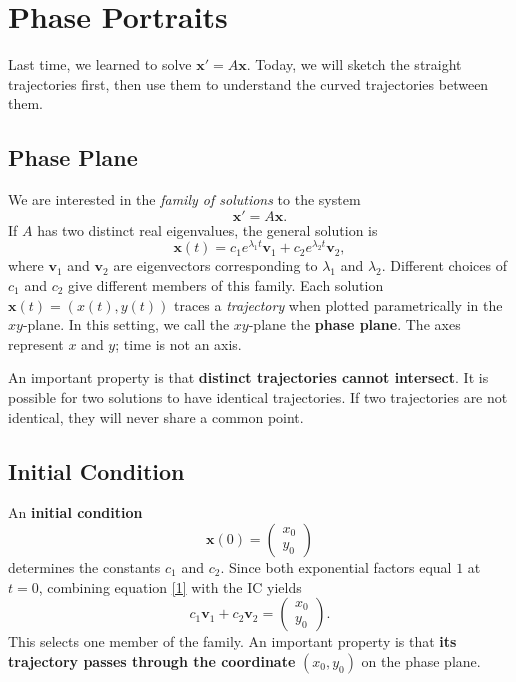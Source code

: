 \documentclass[11pt,letterpaper]{article}
\begin{document}
\section{Phase Portraits}


Last time, we learned to solve $\mathbf{x}'=A\mathbf{x}$.
Today, we will sketch the straight trajectories first, then use them
to understand the curved trajectories between them.

\subsection{Phase Plane}

We are interested in the \textit{family of solutions}
to the system
\[
    \mathbf{x}'=A\mathbf{x}.
\]
If $A$ has two distinct real eigenvalues, the general
solution is
\begin{equation}    \label{1}
    \mathbf{x}(t)
    =c_1e^{\lambda_1t}\mathbf{v}_1
    +c_2e^{\lambda_2t}\mathbf{v}_2,
\end{equation}
where $\mathbf{v}_1$ and $\mathbf{v}_2$ are eigenvectors
corresponding to $\lambda_1$ and $\lambda_2$.
Different choices of $c_1$ and $c_2$ give different
members of this family. Each solution $\mathbf{x}(t)=(x(t),y(t))$
traces a \textit{trajectory} when plotted parametrically
in the $xy$-plane. In this setting, we call the
$xy$-plane the \textbf{phase plane}.
The axes represent $x$ and $y$; time is not an axis.

An important property is that \textbf{distinct trajectories
cannot intersect}. It is possible for two solutions to have identical trajectories. If two trajectories are not identical, they will never share a common point.

\subsection{Initial Condition}

An \textbf{initial condition}
\[
    \mathbf{x}(0)=
    \begin{pmatrix}x_0\\y_0\end{pmatrix}
\]
determines the constants $c_1$ and $c_2$.
Since both exponential factors equal $1$ at $t=0$, combining equation \eqref{1} with the IC yields
\[
    c_1\mathbf{v}_1+c_2\mathbf{v}_2
    =\begin{pmatrix}x_0\\y_0\end{pmatrix}.
\]
This selects one member of the family.
An important property is that \textbf{its trajectory passes through the coordinate}
$(x_0,y_0)$ on the phase plane.
\end{document}
